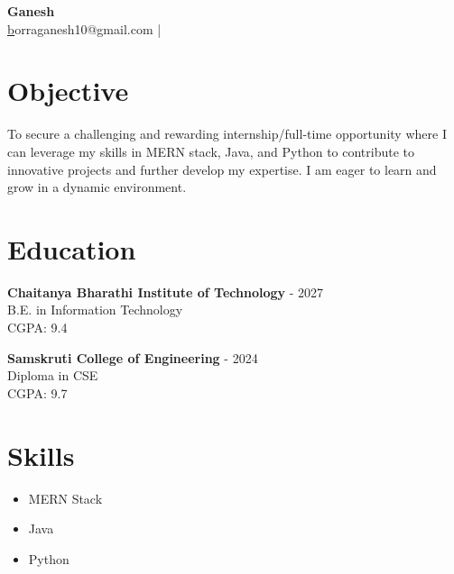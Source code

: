 \documentclass[a4paper,10pt]{article}
\begin{document}
\pagestyle{empty}

\begin{center}
    {\LARGE \textbf{ Ganesh }}\\
    \href{mailto: borraganesh10@gmail.com }borraganesh10@gmail.com \quad |  \\
\end{center}


    
\section*{Objective}
\noindent
To secure a challenging and rewarding internship/full-time opportunity where I can leverage my skills in MERN stack, Java, and Python to contribute to innovative projects and further develop my expertise.  I am eager to learn and grow in a dynamic environment.
\vspace{0.3cm}


\section*{Education}

    \textbf{ Chaitanya Bharathi Institute of Technology }  - 2027 \\
    {  } B.E. in Information Technology \\
    {  }  CGPA: 9.4

    \textbf{ Samskruti College of Engineering }  - 2024 \\
    {  } Diploma in CSE \\
    {  }  CGPA: 9.7



\section*{Skills}
\begin{itemize}[leftmargin=*]
  
    \item MERN Stack 
  
    \item Java 
  
    \item Python
  
\end{itemize}


\end{document}
